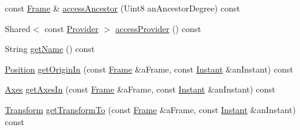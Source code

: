 \begin{DoxyCompactItemize}
\item 
const \hyperlink{classlibrary_1_1physics_1_1coord_1_1_frame}{Frame} \& \hyperlink{classlibrary_1_1physics_1_1coord_1_1_frame_a82db48e361c6804146083c7478a2528f}{access\+Ancestor} (Uint8 an\+Ancestor\+Degree) const
\item 
Shared$<$ const \hyperlink{classlibrary_1_1physics_1_1coord_1_1frame_1_1_provider}{Provider} $>$ \hyperlink{classlibrary_1_1physics_1_1coord_1_1_frame_a5da9096ace352a91d272677cc159c059}{access\+Provider} () const
\item 
String \hyperlink{classlibrary_1_1physics_1_1coord_1_1_frame_afec582db83d2bf93b2b070f8557ee760}{get\+Name} () const
\item 
\hyperlink{classlibrary_1_1physics_1_1coord_1_1_position}{Position} \hyperlink{classlibrary_1_1physics_1_1coord_1_1_frame_a3cdd1a0db22e1112c48cff6f8d8607d5}{get\+Origin\+In} (const \hyperlink{classlibrary_1_1physics_1_1coord_1_1_frame}{Frame} \&a\+Frame, const \hyperlink{classlibrary_1_1physics_1_1time_1_1_instant}{Instant} \&an\+Instant) const
\item 
\hyperlink{classlibrary_1_1physics_1_1coord_1_1_axes}{Axes} \hyperlink{classlibrary_1_1physics_1_1coord_1_1_frame_a6d5c6a2f3b821c4bc621fa75cccdf333}{get\+Axes\+In} (const \hyperlink{classlibrary_1_1physics_1_1coord_1_1_frame}{Frame} \&a\+Frame, const \hyperlink{classlibrary_1_1physics_1_1time_1_1_instant}{Instant} \&an\+Instant) const
\item 
\hyperlink{classlibrary_1_1physics_1_1coord_1_1_transform}{Transform} \hyperlink{classlibrary_1_1physics_1_1coord_1_1_frame_ac60457a6704a977a7ef088bc4ea249f6}{get\+Transform\+To} (const \hyperlink{classlibrary_1_1physics_1_1coord_1_1_frame}{Frame} \&a\+Frame, const \hyperlink{classlibrary_1_1physics_1_1time_1_1_instant}{Instant} \&an\+Instant) const
\end{DoxyCompactItemize}
